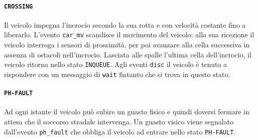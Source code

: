 \documentclass{memoir}
\begin{document}
\begin{figure}[h]
  \centering
\end{figure}

\paragraph{\texttt{CROSSING}} Il veicolo impegna l'incrocio secondo la sua rotta
e con velocità costante fino a liberarlo. L'evento \texttt{car\_mv} scandisce il
movimento del veicolo: alla sua ricezione il veicolo interroga i sensori di
prossimità, per poi avanzare alla cella successiva in assenza di ostacoli
nell'incrocio. Lasciata alle spalle l'ultima cella dell'incrocio, il veicolo
ritorna nello stato \texttt{INQUEUE}. Agli eventi \texttt{disc} il veicolo è
tenuto a rispondere con un messaggio di \texttt{wait} fintanto che si trova in
questo stato.


\begin{figure}[h]
  \centering
\end{figure}


\paragraph{\texttt{PH-FAULT}}
Ad ogni istante il veicolo può subire un guasto fisico e quindi doversi fermare
in attesa che il soccorso stradale intervenga. Un guasto visico viene segnalato
dall'evento \texttt{ph\_fault} che obbliga il veicolo ad entrare nello stato
\texttt{PH-FAULT}.
\end{document}
